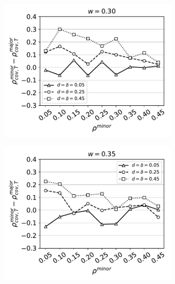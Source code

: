 \begin{figure}[H]
\begin{subfigure}{0.315\textwidth}
    \includegraphics[width=\textwidth]{Figures/full-minority-homophily=0p30.pdf}
  \end{subfigure}
  \begin{subfigure}{0.315\textwidth}
    \includegraphics[width=\textwidth]{Figures/full-minority-homophily=0p35.pdf}
  \end{subfigure}
  \begin{subfigure}{0.315\textwidth}

\end{subfigure}
\end{figure}
